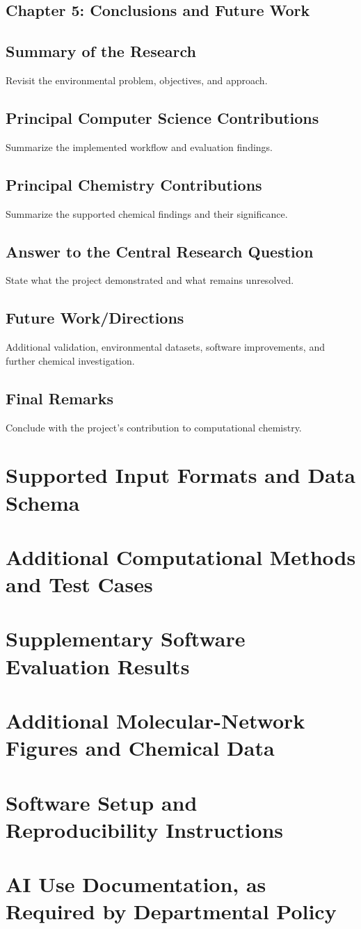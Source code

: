 \documentclass[11pt]{article}
\begin{document}
\begin{doublespace}
\section{Chapter 5: Conclusions and Future Work}
    \subsection{Summary of the Research}
        Revisit the environmental problem, objectives, and approach.
    \subsection{Principal Computer Science Contributions}
        Summarize the implemented workflow and evaluation findings.
    \subsection{Principal Chemistry Contributions}
        Summarize the supported chemical findings and their significance.
    \subsection{Answer to the Central Research Question}
        State what the project demonstrated and what remains unresolved.
    \subsection{Future Work/Directions}
        Additional validation, environmental datasets, software improvements, and further chemical investigation.
    \subsection{Final Remarks}
        Conclude with the project's contribution to computational chemistry.

\end{doublespace}

\newpage


\appendix

\section{Supported Input Formats and Data Schema}
\section{Additional Computational Methods and Test Cases}
\section{Supplementary Software Evaluation Results}
\section{Additional Molecular-Network Figures and Chemical Data}
\section{Software Setup and Reproducibility Instructions}
\section{AI Use Documentation, as Required by Departmental Policy}
\end{document}
